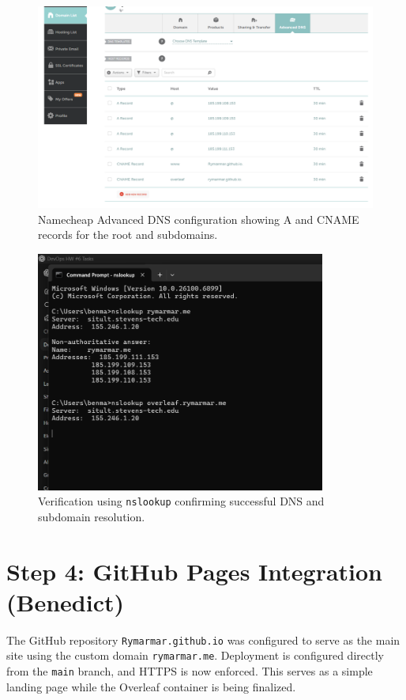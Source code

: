 \begin{figure}[h!]
    \centering
    \includegraphics[width=\textwidth]{png/DomainNames/namespacesettings.png}
    \caption{Namecheap Advanced DNS configuration showing A and CNAME records for the root and subdomains.}
\end{figure}

\begin{figure}[h!]
    \centering
    \includegraphics[width=0.85\textwidth]{png/DomainNames/cmd_checkup.png}
    \caption{Verification using \texttt{nslookup} confirming successful DNS and subdomain resolution.}
\end{figure}

\section{Step 4: GitHub Pages Integration (Benedict)}
The GitHub repository \texttt{Rymarmar.github.io} was configured to serve as the main site using the custom domain \texttt{rymarmar.me}.  
Deployment is configured directly from the \texttt{main} branch, and HTTPS is now enforced.  
This serves as a simple landing page while the Overleaf container is being finalized.

